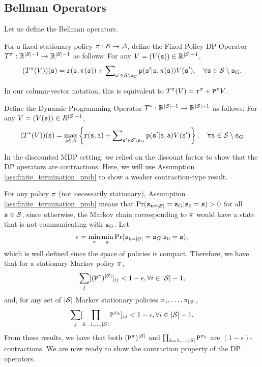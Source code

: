 \subsection{Bellman Operators}
Let us define the Bellman operators.
\begin{definition}
For a fixed stationary policy $\pi :\mathcal{S} \to \mathcal{A}$,
define the Fixed Policy DP Operator $T^\pi:\mathbb{R}^{|\mathcal{S}|-1}
\to \mathbb{R}^{|\mathcal{S}|-1}$ as follows: For any $V=(V({\tt s}))\in
\mathbb{R}^{|\mathcal{S}|-1}$,
\[(T_{}^\pi (V))({\tt s}) = {\tt r}({\tt s},\pi({\tt s})) + \sum\nolimits_{{\tt s}' \in \mathcal{S} \setminus {\tt s}_G} {{\tt p}({\tt s}'|{\tt s},\pi ({\tt s}))V({\tt s}')} ,\quad\forall {\tt s} \in \mathcal{S} \setminus {\tt s}_G.\]
\end{definition}
In our column-vector notation, this is equivalent to  $T^\pi
(V) = {{\tt r}^\pi } + {{\tt P}^\pi }V$.

\begin{definition}
Define the Dynamic Programming
Operator  $T^*:\mathbb R^{|\mathcal{S}| -1} \to \mathbb R^{|\mathcal{S}| -1}$ as
follows: For any $V=(V({\tt s}))\in R^{|\mathcal{S}|-1}$,
\[(T_{}^*(V))({\tt s}) = \mathop {\max }\limits_{{\tt a} \in \mathcal{A}} \left\{ {{\tt r}({\tt s},{\tt a}) +  \sum\nolimits_{{\tt s}' \in \mathcal{S} \setminus {\tt s}_G} {{\tt p}({\tt s}'|{\tt s},{\tt a})V({\tt s}')} } \right\},\quad \forall {\tt s} \in \mathcal{S}\setminus {\tt s}_G\]
\end{definition}

In the discounted MDP setting, we relied on the discount factor to show that the DP operators are contractions. Here, we will use Assumption \ref{ass:finite_termination_prob} to show a weaker contraction-type result.

For any policy $\pi$ (not necessarily stationary), Assumption \ref{ass:finite_termination_prob} means that $\Pr ({\tt s}_{{\tt t}=|\mathcal{S}|} = {\tt s}_G | {\tt s}_0 = {\tt s}) > 0$ for all ${\tt s} \in \mathcal{S}$, since otherwise, the Markov chain corresponding to $\pi$ would have a state that is not communicating with ${\tt s}_G$. Let
\begin{equation*}
    \epsilon = \min_{\pi} \min_{{\tt s}} \Pr ({\tt s}_{{\tt t}=|\mathcal{S}|} = {\tt s}_G | {\tt s}_0 = {\tt s}),
\end{equation*}
which is well defined since the space of policies is compact.
Therefore, we have that for a stationary Markov policy $\pi$,
\begin{equation}
    \sum_{j}[({\tt P}^\pi)^{|\mathcal{S}|}]_{ij} < 1-\epsilon, \forall i \in |\mathcal{S}|-1,
\end{equation}
and, for any set of $|\mathcal{S}|$ Markov stationary policies $\pi_1,\dots,\pi_{|\mathcal{S}|}$,
\begin{equation}
    \sum_{j}[\prod_{k=1,\dots,|\mathcal{S}|} {\tt P}^{\pi_k}]_{ij} < 1-\epsilon, \forall i \in |\mathcal{S}|-1.
\end{equation}
From these results, we have that both $({\tt P}^\pi)^{|\mathcal{S}|}$ and $\prod_{k=1,\dots,|\mathcal{S}|} {\tt P}^{\pi_k}$ are $(1-\epsilon)$-contractions.
We are now ready to show the contraction property of the DP operators.

